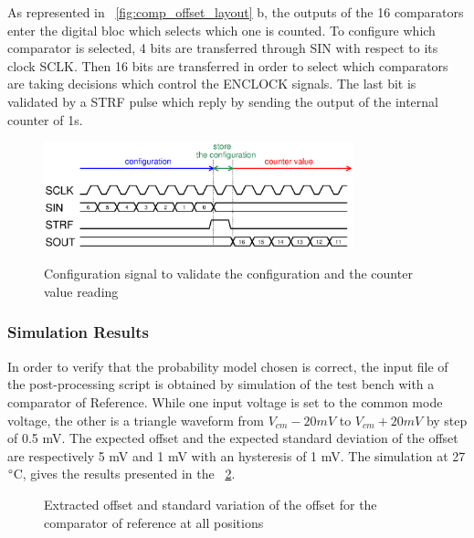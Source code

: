 As represented in \figurename~\ref{fig:comp_offset_layout} b, the outputs of the 16 comparators enter the digital bloc which selects which one is counted. To configure which comparator is selected, 4 bits are transferred through SIN with respect to its clock SCLK\@. Then 16 bits are transferred in order to select which comparators are taking decisions which control the ENCLOCK signals. The last bit is validated by a STRF pulse which reply by sending the output of the internal counter of 1s.

\begin{figure}[htp]
    \centering
    \includegraphics[width=0.8\textwidth]{Chapter5/Figs/comp_test/configuration-patternc.ps}
    \label{fig:test-comp-pattern-c-config}
    \caption{Configuration signal to validate the configuration and the counter value reading}
\end{figure}

\subsubsection{Simulation Results}
In order to verify that the probability model chosen is correct, the input file of the post-processing script is obtained by simulation of the test bench with a comparator of Reference. While one input voltage is set to the common mode voltage, the other is a triangle waveform from $V_{cm}-20 mV$ to $V_{cm}+20 mV$ by step of 0.5 mV. The expected offset and the expected standard deviation of the offset are respectively 5 mV and 1 mV with an hysteresis of 1 mV. The simulation at 27$\degree$C, gives the results presented in the \figurename~\ref{fig:offset_conv_verif}.

\begin{figure}[htp]
    \centering
    \begin{subfigure}[b]{0.32\textwidth}
    \end{subfigure}
    \begin{subfigure}[b]{0.32\textwidth}
    \end{subfigure}
    \begin{subfigure}[b]{0.32\textwidth}
    \end{subfigure}
    \caption{Extracted offset and standard variation of the offset for the comparator of reference at all positions}
    \label{fig:offset_conv_verif}
\end{figure}

